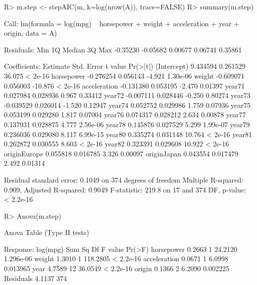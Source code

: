 \documentclass[
]{jss}
\begin{document}
\begin{CodeChunk}
\begin{CodeInput}
R> m.step <- stepAIC(m, k=log(nrow(A)), trace=FALSE)
R> summary(m.step)
\end{CodeInput}
\begin{CodeOutput}

Call:
lm(formula = log(mpg) ~ horsepower + weight + acceleration + 
    year + origin, data = A)

Residuals:
     Min       1Q   Median       3Q      Max 
-0.35230 -0.05682  0.00677  0.06741  0.35861 

Coefficients:
              Estimate Std. Error t value Pr(>|t|)
(Intercept)   9.434594   0.261529  36.075  < 2e-16
horsepower   -0.276254   0.056143  -4.921 1.30e-06
weight       -0.609071   0.056003 -10.876  < 2e-16
acceleration -0.131380   0.053195  -2.470  0.01397
year71        0.027984   0.028936   0.967  0.33412
year72       -0.007111   0.028446  -0.250  0.80274
year73       -0.039529   0.026014  -1.520  0.12947
year74        0.052752   0.029986   1.759  0.07936
year75        0.053199   0.029280   1.817  0.07004
year76        0.074317   0.028212   2.634  0.00878
year77        0.137931   0.028875   4.777 2.56e-06
year78        0.145876   0.027529   5.299 1.99e-07
year79        0.236036   0.029080   8.117 6.99e-15
year80        0.335274   0.031148  10.764  < 2e-16
year81        0.262872   0.030555   8.603  < 2e-16
year82        0.323391   0.029608  10.922  < 2e-16
originEurope  0.055818   0.016785   3.326  0.00097
originJapan   0.043554   0.017479   2.492  0.01314

Residual standard error: 0.1049 on 374 degrees of freedom
Multiple R-squared:  0.909, Adjusted R-squared:  0.9049 
F-statistic: 219.8 on 17 and 374 DF,  p-value: < 2.2e-16
\end{CodeOutput}
\begin{CodeInput}
R> Anova(m.step)
\end{CodeInput}
\begin{CodeOutput}
Anova Table (Type II tests)

Response: log(mpg)
             Sum Sq  Df  F value    Pr(>F)
horsepower   0.2663   1  24.2120 1.296e-06
weight       1.3010   1 118.2805 < 2.2e-16
acceleration 0.0671   1   6.0998  0.013965
year         4.7589  12  36.0549 < 2.2e-16
origin       0.1366   2   6.2090  0.002225
Residuals    4.1137 374                   
\end{CodeOutput}
\end{CodeChunk}
\end{document}
